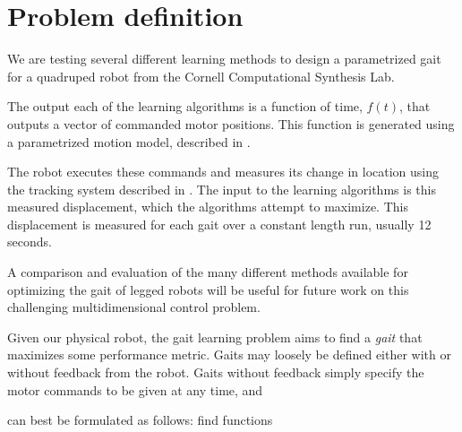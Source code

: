 \section{Problem definition}


We are testing several different learning methods to design a
parametrized gait for a quadruped robot from the Cornell Computational
Synthesis Lab.

The output each of the learning algorithms is a function of time,
$f(t)$, that outputs a vector of commanded motor positions.  This
function is generated using a parametrized motion model, described in
.

The robot executes these commands and measures its change in location
using the tracking system described in .  The input
to the learning algorithms is this measured displacement, which the
algorithms attempt to maximize. This displacement is measured for each
gait over a constant length run, usually 12 seconds.

A comparison and evaluation of the many different methods available
for optimizing the gait of legged robots will be useful for future
work on this challenging multidimensional control problem.



Given our physical robot, the gait learning problem aims to find a
\emph{gait} that maximizes some performance metric.  Gaits may loosely
be defined either with or without feedback from the robot.  Gaits
without feedback simply specify the motor commands to be given at any
time, and


can best be
formulated as follows: find functions
